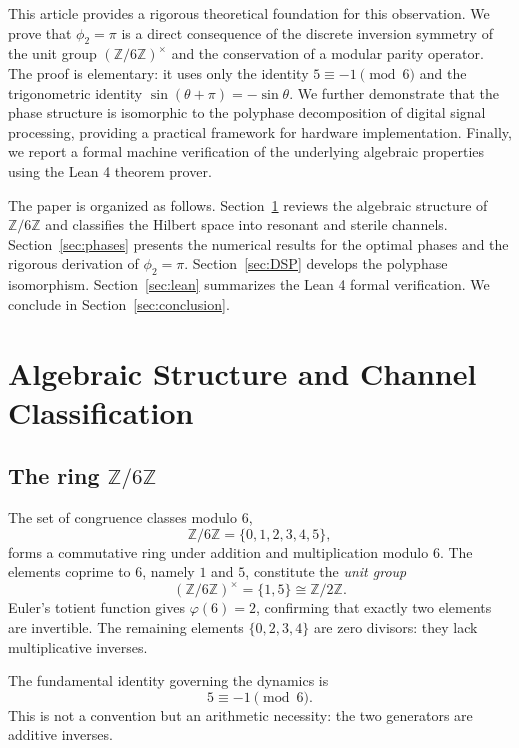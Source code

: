 \documentclass[12pt,a4paper]{article}
\theoremstyle{plain}
\theoremstyle{definition}
\theoremstyle{remark}
\begin{document}
This article provides a rigorous theoretical foundation for this observation. We prove that \(\phi_2 = \pi\) is a direct consequence of the discrete inversion symmetry of the unit group \((\mathbb{Z}/6\mathbb{Z})^{\times}\) and the conservation of a modular parity operator. The proof is elementary: it uses only the identity \(5 \equiv -1 \pmod{6}\) and the trigonometric identity \(\sin(\theta + \pi) = -\sin\theta\). We further demonstrate that the phase structure is isomorphic to the polyphase decomposition of digital signal processing, providing a practical framework for hardware implementation. Finally, we report a formal machine verification of the underlying algebraic properties using the Lean 4 theorem prover.

The paper is organized as follows. Section~\ref{sec:algebra} reviews the algebraic structure of \(\mathbb{Z}/6\mathbb{Z}\) and classifies the Hilbert space into resonant and sterile channels. Section~\ref{sec:phases} presents the numerical results for the optimal phases and the rigorous derivation of \(\phi_2 = \pi\). Section~\ref{sec:DSP} develops the polyphase isomorphism. Section~\ref{sec:lean} summarizes the Lean 4 formal verification. We conclude in Section~\ref{sec:conclusion}.

\section{Algebraic Structure and Channel Classification}
\label{sec:algebra}

\subsection{The ring \(\mathbb{Z}/6\mathbb{Z}\)}
The set of congruence classes modulo 6,
\begin{equation}
\mathbb{Z}/6\mathbb{Z} = \{0, 1, 2, 3, 4, 5\},
\end{equation}
forms a commutative ring under addition and multiplication modulo 6. The elements coprime to 6, namely \(1\) and \(5\), constitute the \emph{unit group}
\begin{equation}
(\mathbb{Z}/6\mathbb{Z})^{\times} = \{1, 5\} \cong \mathbb{Z}/2\mathbb{Z}.
\label{eq:unitgroup}
\end{equation}
Euler's totient function gives \(\varphi(6) = 2\), confirming that exactly two elements are invertible. The remaining elements \(\{0,2,3,4\}\) are zero divisors: they lack multiplicative inverses.

The fundamental identity governing the dynamics is
\begin{equation}
5 \equiv -1 \pmod{6}.
\label{eq:inverse}
\end{equation}
This is not a convention but an arithmetic necessity: the two generators are additive inverses.
\end{document}
